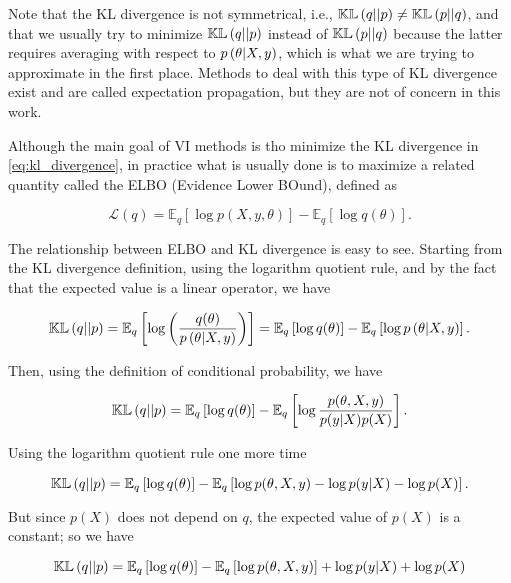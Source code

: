 Note that the KL divergence is not symmetrical, i.e., $\mathbb{KL}\left( q || p \right) \neq \mathbb{KL}\left( p || q \right)$, and that we usually try to minimize $\mathbb{KL}\left( q || p \right)$ instead of $\mathbb{KL}\left( p || q \right)$ because the latter requires averaging with respect to $p\left( \theta | X, y \right)$, which is what we are trying to approximate in the first place. Methods to deal with this type of KL divergence exist and are called expectation propagation, but they are not of concern in this work.

Although the main goal of VI methods is tho minimize the KL divergence in \ref{eq:kl_divergence}, in practice what is usually done is to maximize a related quantity called the ELBO (Evidence Lower BOund), defined as

\begin{equation}
  \label{eq:elbo_def}
  \mathcal{L}(q) = \mathbb{E}_q\left[ \log p(X, y, \theta) \right] - \mathbb{E}_q\left[ \log q(\theta) \right].
\end{equation}

The relationship between ELBO and KL divergence is easy to see. Starting from the KL divergence definition, using the logarithm quotient rule, and by the fact that the expected value is a linear operator, we have

$$
    \mathbb{KL}\left( q || p \right) =
    \mathbb{E}_q \left[ \log \left( \frac{q(\theta)}{p\left( \theta | X, y \right)} \right) \right] =
    \mathbb{E}_q \left[ \log  q(\theta) \right] - \mathbb{E}_q \left[ \log {p\left( \theta | X, y \right)}  \right].
$$

Then, using the definition of conditional probability, we have

$$
    \mathbb{KL}\left( q || p \right) =
    \mathbb{E}_q \left[ \log  q(\theta) \right] - \mathbb{E}_q \left[ \log \frac{p(\theta, X, y)}{p(y | X) p(X)}  \right].
$$

Using the logarithm quotient rule one more time

$$
  \mathbb{KL}\left( q || p \right) =
  \mathbb{E}_q \left[ \log  q(\theta) \right] - \mathbb{E}_q \left[ \log p(\theta, X, y) - \log p(y | X) - \log p(X)  \right].
$$

But since $p(X)$ does not depend on $q$, the expected value of $p(X)$ is a constant; so we have

$$
 \mathbb{KL}\left( q || p \right) =
 \mathbb{E}_q \left[ \log  q(\theta) \right] - \mathbb{E}_q \left[ \log p(\theta, X, y) \right] + \log p(y | X) + \log p(X)
$$

